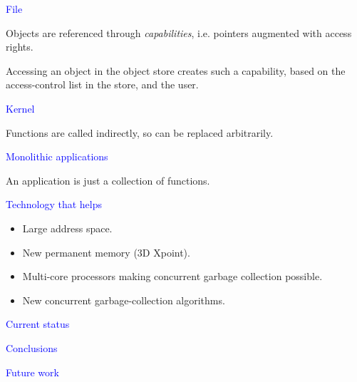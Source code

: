 \documentclass{slides}
\newcommand{\ti}[1]{\begin{center}\Large{\textcolor{blue}{#1}}\end{center}}
\begin{document}
\begin{slide}\ti{File}

Objects are referenced through \emph{capabilities}, i.e. pointers
augmented with access rights.

Accessing an object in the object store creates such a capability,
based on the access-control list in the store, and the user.

\vfill\end{slide}
\begin{slide}\ti{Kernel}

Functions are called indirectly, so can be replaced arbitrarily.

\vfill\end{slide}
\begin{slide}\ti{Monolithic applications}

An application is just a collection of functions.

\vfill\end{slide}
\begin{slide}\ti{}

\vfill\end{slide}
\begin{slide}\ti{}

\vfill\end{slide}
\begin{slide}\ti{Technology that helps}

  \begin{itemize}
  \item Large address space.
  \item New permanent memory (3D Xpoint).
  \item Multi-core processors making concurrent garbage collection
    possible. 
  \item New concurrent garbage-collection algorithms.
  \end{itemize}

\vfill\end{slide}
\begin{slide}\ti{Current status}
\vfill\end{slide}
\begin{slide}\ti{Conclusions}

\vfill\end{slide}
\begin{slide}\ti{Future work}

\vfill\end{slide}
\end{document}
